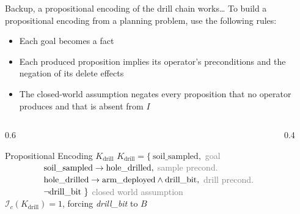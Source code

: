 \begin{frame}[noframenumbering]{Backup, a propositional encoding of the drill chain works\dots}
    \hypertarget{bk:naive-drill}{}
    To build a propositional encoding from a planning problem, use the following rules:
    \begin{itemize}
        \item Each goal becomes a fact
        \item Each produced proposition implies its operator's preconditions and the negation of its delete effects
        \item The closed-world assumption negates every proposition that no operator produces and that is absent from $I$
    \end{itemize}

    \begin{columns}[T]
        \begin{column}{0.6\textwidth}
            \begin{exampleblock}{Propositional Encoding $K_{\text{drill}}$}
                \footnotesize
                $K_{\text{drill}} = \{\ \text{soil\_sampled},$ \hfill {\scriptsize\textcolor{gray}{goal}} \\[2pt]
                $\hphantom{K_{\text{drill}} = \{\ } \text{soil\_sampled} \rightarrow \text{hole\_drilled},$ \hfill {\scriptsize\textcolor{gray}{sample precond.}} \\[2pt]
                $\hphantom{K_{\text{drill}} = \{\ } \text{hole\_drilled} \rightarrow \text{arm\_deployed} \land \text{drill\_bit},$ \hfill {\scriptsize\textcolor{gray}{drill precond.}} \\[2pt]
                $\hphantom{K_{\text{drill}} = \{\ } \neg \text{drill\_bit}\ \}$ \hfill {\scriptsize\textcolor{gray}{closed world assumption}} \\[4pt]
                $\mathcal{I}_c(K_{\text{drill}}) = 1$, forcing \textit{drill\_bit} to $B$
            \end{exampleblock}
        \end{column}
        \begin{column}{0.4\textwidth}
            \centering
            
        \end{column}
    \end{columns}

\end{frame}

